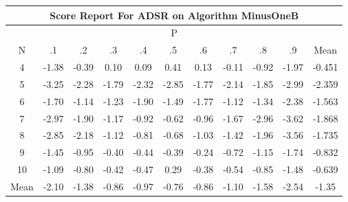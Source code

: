 \documentclass[11pt,a4paper]{report}
\begin{document}
\begin{longtable}{ | c || c | c | c | c | c | c | c | c | c || c |}
\hline
\multicolumn{11}{|c|}{ Score Report For ADSR on Algorithm MinusOneB} \\
\hline
\multicolumn{11}{|c|}{ P } \\
\hline
N & .1 & .2 & .3 & .4 & .5 & .6 & .7 & .8 & .9 & Mean\\
 \hline
 \hline
 \endhead
  4 &  \cellcolor[HTML]{FFDFDF} -1.38 &  \cellcolor[HTML]{FFF7F7} -0.39 &  \cellcolor[HTML]{FFFFFF} 0.10 &  \cellcolor[HTML]{FFFFFF} 0.09 &  \cellcolor[HTML]{F7F7FF} 0.41 &  \cellcolor[HTML]{FFFFFF} 0.13 &  \cellcolor[HTML]{FFFFFF} -0.11 &  \cellcolor[HTML]{FFE7E7} -0.92 &  \cellcolor[HTML]{FFCFCF} -1.97 & -0.451 \\
  5 &  \cellcolor[HTML]{FFAFAF} -3.25 &  \cellcolor[HTML]{FFC7C7} -2.28 &  \cellcolor[HTML]{FFCFCF} -1.79 &  \cellcolor[HTML]{FFC7C7} -2.32 &  \cellcolor[HTML]{FFB7B7} -2.85 &  \cellcolor[HTML]{FFCFCF} -1.77 &  \cellcolor[HTML]{FFC7C7} -2.14 &  \cellcolor[HTML]{FFCFCF} -1.85 &  \cellcolor[HTML]{FFB7B7} -2.99 & -2.359 \\
  6 &  \cellcolor[HTML]{FFD7D7} -1.70 &  \cellcolor[HTML]{FFDFDF} -1.14 &  \cellcolor[HTML]{FFDFDF} -1.23 &  \cellcolor[HTML]{FFCFCF} -1.90 &  \cellcolor[HTML]{FFD7D7} -1.49 &  \cellcolor[HTML]{FFCFCF} -1.77 &  \cellcolor[HTML]{FFDFDF} -1.12 &  \cellcolor[HTML]{FFDFDF} -1.34 &  \cellcolor[HTML]{FFBFBF} -2.38 & -1.563 \\
  7 &  \cellcolor[HTML]{FFB7B7} -2.97 &  \cellcolor[HTML]{FFCFCF} -1.90 &  \cellcolor[HTML]{FFDFDF} -1.17 &  \cellcolor[HTML]{FFE7E7} -0.92 &  \cellcolor[HTML]{FFEFEF} -0.62 &  \cellcolor[HTML]{FFE7E7} -0.96 &  \cellcolor[HTML]{FFD7D7} -1.67 &  \cellcolor[HTML]{FFB7B7} -2.96 &  \cellcolor[HTML]{FFA7A7} -3.62 & -1.868 \\
  8 &  \cellcolor[HTML]{FFB7B7} -2.85 &  \cellcolor[HTML]{FFC7C7} -2.18 &  \cellcolor[HTML]{FFDFDF} -1.12 &  \cellcolor[HTML]{FFE7E7} -0.81 &  \cellcolor[HTML]{FFEFEF} -0.68 &  \cellcolor[HTML]{FFE7E7} -1.03 &  \cellcolor[HTML]{FFDFDF} -1.42 &  \cellcolor[HTML]{FFCFCF} -1.96 &  \cellcolor[HTML]{FFA7A7} -3.56 & -1.735 \\
  9 &  \cellcolor[HTML]{FFD7D7} -1.45 &  \cellcolor[HTML]{FFE7E7} -0.95 &  \cellcolor[HTML]{FFF7F7} -0.40 &  \cellcolor[HTML]{FFF7F7} -0.44 &  \cellcolor[HTML]{FFF7F7} -0.39 &  \cellcolor[HTML]{FFF7F7} -0.24 &  \cellcolor[HTML]{FFEFEF} -0.72 &  \cellcolor[HTML]{FFDFDF} -1.15 &  \cellcolor[HTML]{FFD7D7} -1.74 & -0.832 \\
  10 &  \cellcolor[HTML]{FFE7E7} -1.09 &  \cellcolor[HTML]{FFE7E7} -0.80 &  \cellcolor[HTML]{FFF7F7} -0.42 &  \cellcolor[HTML]{FFF7F7} -0.47 &  \cellcolor[HTML]{F7F7FF} 0.29 &  \cellcolor[HTML]{FFF7F7} -0.38 &  \cellcolor[HTML]{FFEFEF} -0.54 &  \cellcolor[HTML]{FFE7E7} -0.85 &  \cellcolor[HTML]{FFD7D7} -1.48 & -0.639 \\
 \hline
 \hline
Mean &  \cellcolor[HTML]{FFC7C7} -2.10 &  \cellcolor[HTML]{FFDFDF} -1.38 &  \cellcolor[HTML]{FFE7E7} -0.86 &  \cellcolor[HTML]{FFE7E7} -0.97 &  \cellcolor[HTML]{FFEFEF} -0.76 &  \cellcolor[HTML]{FFE7E7} -0.86 &  \cellcolor[HTML]{FFE7E7} -1.10 &  \cellcolor[HTML]{FFD7D7} -1.58 &  \cellcolor[HTML]{FFBFBF} -2.54 &  \cellcolor[HTML]{FFDFDF} -1.35
\end{longtable}
\end{document}
